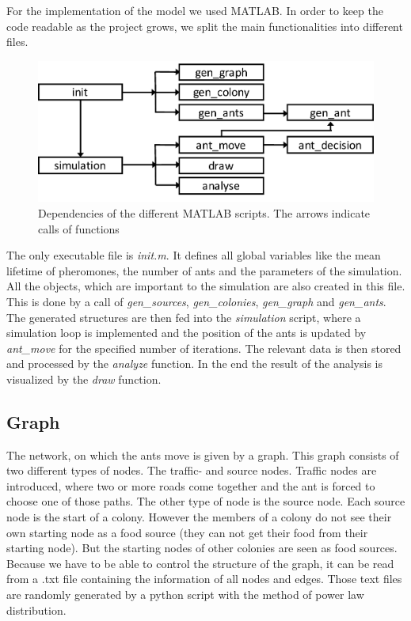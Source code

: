 For the implementation of the model we used MATLAB. In order to keep the code readable as the project grows, we split the main functionalities into different files.
\begin{figure}[H]
	\centering
	\includegraphics[scale=0.5]{Dependencies.pdf}
	\caption{Dependencies of the different MATLAB scripts. The arrows indicate calls of functions}
\end{figure}
The only executable file is \textit{init.m}. It defines all global variables like the mean lifetime of pheromones, the number of ants and the parameters of the simulation. All the objects, which are important to the simulation are also created in this file. This is done by a call of \textit{gen\_sources}, \textit{gen\_colonies}, \textit{gen\_graph} and \textit{gen\_ants}. The generated structures are then fed into the \textit{simulation} script, where a simulation loop is implemented and the position of the ants is updated by \textit{ant\_move} for the specified number of iterations. The relevant data is then stored and processed by the \textit{analyze} function. In the end the result of the analysis is visualized by the \textit{draw} function.
\subsection{Graph}
The network, on which the ants move is given by a graph. This graph consists of two different types of nodes. The traffic- and source nodes. Traffic nodes are introduced, where two or more roads come together and the ant is forced to choose one of those paths. The other type of node is the source node. Each source node is the start of a colony. However the members of a colony do not see their own starting node as a food source (they can not get their food from their starting node). But the starting nodes of other colonies are seen as food sources. Because we have to be able to control the structure of the graph, it can be read from a .txt file containing the information of all nodes and edges. Those text files are randomly generated by a python script with the method of power law distribution.
